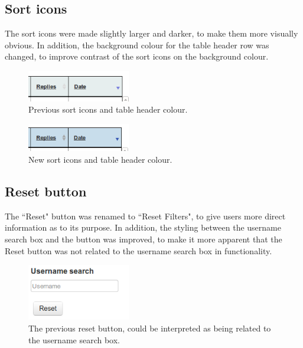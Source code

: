 \subsection{Sort icons}
The sort icons were made slightly larger and darker, to make them more visually obvious. In addition, the background colour for the table header row was changed, to improve contrast \citep[p. 650]{Galitz} of the sort icons on the background colour. 
\begin{figure}[h!]
    \centering
    \includegraphics[width=0.4\textwidth]{Figures/V2/oldsort.png}
 \caption{Previous sort icons and table header colour.}
\end{figure}

\begin{figure}[h!]
    \centering
    \includegraphics[width=0.4\textwidth]{Figures/V2/newsort.png}
 \caption{New sort icons and table header colour.}
\end{figure}

\subsection{Reset button}
The ``Reset" button was renamed to ``Reset Filters", to give users more direct information \citep[p. 520]{Galitz} as to its purpose. In addition, the styling between the username search box and the button was improved, to make it more apparent that the Reset button was not related to the username search box in functionality. 
\begin{figure}[h!]
    \centering
    \includegraphics[width=0.4\textwidth]{Figures/V2/oldreset.png}
 \caption{The previous reset button, could be interpreted as being related to the username search box.}
\end{figure}

